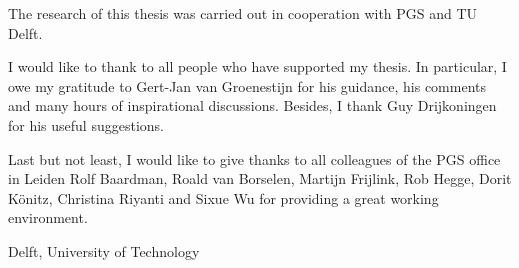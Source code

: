 \documentclass[a4paper,11pt]{mscThesis}
\begin{document}
    The research of this thesis was carried out in cooperation with PGS and TU Delft. 
     
    I would like to thank to all people who have supported my thesis. In particular, I owe my gratitude to Gert-Jan van Groenestijn for his guidance, his comments and many hours of inspirational discussions. Besides, I thank Guy Drijkoningen for his useful suggestions. 
    
    Last but not least, I would like to give thanks to all colleagues of the PGS office in Leiden Rolf Baardman, Roald van Borselen, Martijn Frijlink, Rob Hegge, Dorit K\"{o}nitz, Christina Riyanti and Sixue Wu for providing a great working environment.

    \vspace*{15mm}

    \noindent
    Delft, University of Technology \hfill \mscname\\ %
    \mscdate


%
    


\appendix


    
\end{document}
